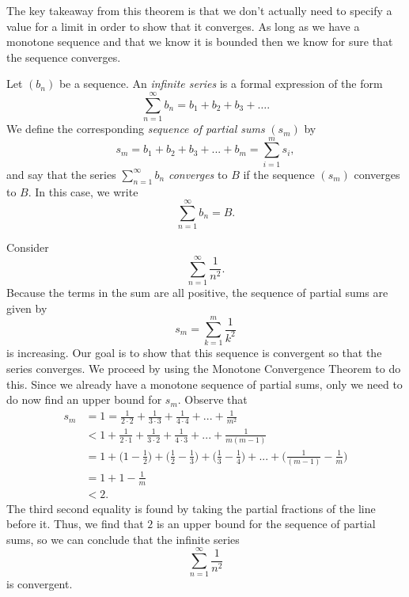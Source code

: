 The key takeaway from this theorem is that we don't actually need to specify a value for a limit in order to show that it converges. As long as we have a monotone sequence and that we know it is bounded then we know for sure that the sequence converges.

\begin{tcolorbox}
    \begin{defn}
        Let \( (b_n)\) be a sequence. An \textit{infinite series} is a formal expression of the form 
        \[ \sum_{n=1}^{ \infty} b_n = b_1 + b_2 + b_3 + \dots { }. \]
        We define the corresponding \textit{sequence of partial sums} \( (s_m)\) by 
        \[ s_m = b_1 + b_2 + b_3 + ... + b_m = \sum_{i=1}^{m} s_i,\]
        and say that the series \( \sum_{n=1}^{ \infty} b_n \) \textit{converges} to \( B \) if the sequence \( (s_m)\) converges to \( B \). In this case, we write 
        \[ \sum_{n=1}^{ \infty} b_n = B.\]
\end{defn}
\end{tcolorbox} 

\begin{ex}
Consider 
\[ \sum_{n=1}^{ \infty} \frac{1}{n^2}.\]
Because the terms in the sum are all positive, the sequence of partial sums are given by 
\[ s_m = \sum_{k = 1}^{ m} \frac{1}{k^2}\]
is increasing. Our goal is to show that this sequence is convergent so that the series converges. We proceed by using the Monotone Convergence Theorem to do this. Since we already have a monotone sequence of partial sums, only we need to do now find an upper bound for \( s_m \). Observe that  
\begin{align*}
s_m &= 1 = \frac{1}{2 \cdot 2} + \frac{1}{3 \cdot 3} + \frac{1}{4 \cdot 4} + ... + \frac{1}{m^2} \\
    &< 1 + \frac{1}{2 \cdot 1} + \frac{1}{3 \cdot 2} + \frac{1}{4 \cdot 3} + ... + \frac{1}{m(m-1)} \\
    &= 1 + \Big(  1 - \frac{1}{2}\Big) + \Big( \frac{1}{2} - \frac{1}{3} \Big) + \Big( \frac{1}{3} - \frac{1}{4} \Big) + ... + \Big( \frac{1}{(m-1)} - \frac{1}{m} \Big) \\
    &= 1 + 1 - \frac{1}{m} \\
    &< 2. 
\end{align*}
The third second equality is found by taking the partial fractions of the line before it.
Thus, we find that \( 2 \) is an upper bound for the sequence of partial sums, so we can conclude that the infinite series 
\[ \sum_{n=1}^{ \infty} \frac{1}{n^2} \]
is convergent.
\end{ex}


